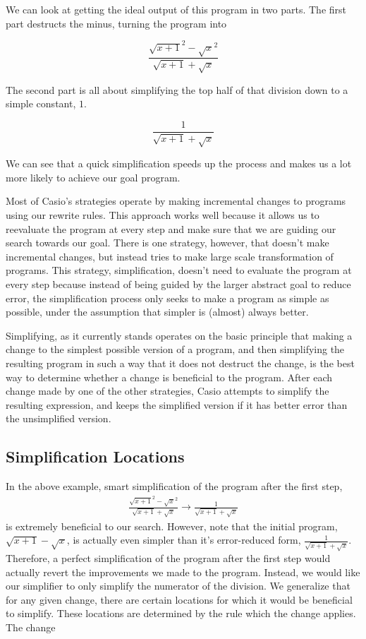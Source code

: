 \documentclass{article}
\newcommand{\sqrsqrt}[1]{\sqrt{#1}^2}
\begin{document}
We can look at getting the ideal output
 of this program 
in two parts. 
The first part destructs the minus, 
turning the program into

\[\frac{\sqrsqrt{x + 1} - \sqrsqrt{x}}{\sqrt{x + 1} + \sqrt{x}}\]

The second part is all about simplifying 
the top half of that division 
down to a simple constant, 
$1$.

\[\frac{1}{\sqrt{x+1}+\sqrt{x}}\]

We can see 
that a quick simplification 
speeds up the process 
and makes us a lot more likely 
to achieve our goal program. 

Most of Casio's strategies
operate by making incremental changes 
to programs using our rewrite rules. 
This approach works well 
because it allows us to reevaluate the program 
at every step 
and make sure that we are guiding our search 
towards our goal. 
There is one strategy, however, 
that doesn't make incremental changes, 
but instead tries to make 
large scale transformation of programs. 
This strategy, simplification, 
doesn't need to evaluate 
the program at every step 
because instead of being guided 
by the larger abstract goal 
to reduce error, 
the simplification process only seeks 
to make a program as simple as possible, 
under the assumption that 
simpler is (almost) always better.

Simplifying, 
as it currently stands 
operates on the basic principle 
that making a change to the 
simplest possible version of a program, 
and then simplifying the resulting program 
in such a way that 
it does not destruct the change, 
is the best way to determine 
whether a change is beneficial 
to the program.
After each change made by one of the other strategies,
Casio attempts to simplify the resulting expression,
and keeps the simplified version
if it has better error than the unsimplified version.

\subsection{Simplification Locations}

In the above example,
smart simplification of the program after the first step,
\begin{align*}
\frac{\sqrsqrt{x+1} - \sqrsqrt{x}}{\sqrt{x+1} + \sqrt{x}}
\to \frac{1}{\sqrt{x+1}+\sqrt{x}}
\end{align*}
is extremely beneficial to our search.
However, note that the initial program, 
$\sqrt{x+1}-\sqrt{x}$,
is actually even simpler than it's error-reduced form,
$\frac{1}{\sqrt{x+1}+\sqrt{x}}$.
Therefore, a perfect simplification
of the program after the first step
would actually revert
the improvements we made to the program.
Instead, we would like our simplifier
to only simplify
the numerator of the division.
We generalize that for any given change, 
there are certain locations 
for which it would be beneficial to simplify. 
These locations are determined 
by the rule which the change applies. 
The change
\end{document}
